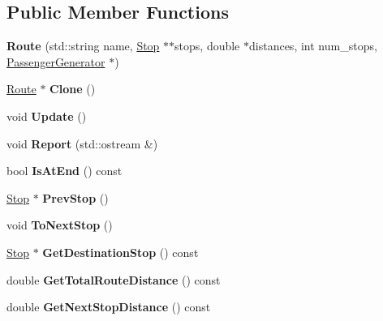 \subsection*{Public Member Functions}
\begin{DoxyCompactItemize}
\item 
\mbox{\label{classRoute_a623dad9165299b72eed1e188f7d3f382}} 
{\bfseries Route} (std\+::string name, \hyperlink{classStop}{Stop} $\ast$$\ast$stops, double $\ast$distances, int num\+\_\+stops, \hyperlink{classPassengerGenerator}{Passenger\+Generator} $\ast$)
\item 
\mbox{\label{classRoute_a4031b4a218b1530e28dcf5ee5c6fa8e7}} 
\hyperlink{classRoute}{Route} $\ast$ {\bfseries Clone} ()
\item 
\mbox{\label{classRoute_a7ecf1d4200f5fe110de4a1d9ea9408c3}} 
void {\bfseries Update} ()
\item 
\mbox{\label{classRoute_a6115a741ea15af716c1a624627ec954a}} 
void {\bfseries Report} (std\+::ostream \&)
\item 
\mbox{\label{classRoute_a529ab995aefd1001b250a6c1ccf77892}} 
bool {\bfseries Is\+At\+End} () const
\item 
\mbox{\label{classRoute_a1924b536cfdb17b5feea61e22fcb4a47}} 
\hyperlink{classStop}{Stop} $\ast$ {\bfseries Prev\+Stop} ()
\item 
\mbox{\label{classRoute_a0d2be355c05f40fda3f0b4e1811d2583}} 
void {\bfseries To\+Next\+Stop} ()
\item 
\mbox{\label{classRoute_a44af714485a55a8b6da374399e036cc1}} 
\hyperlink{classStop}{Stop} $\ast$ {\bfseries Get\+Destination\+Stop} () const
\item 
\mbox{\label{classRoute_af4e0add4a9f6b22963398b41313f9e69}} 
double {\bfseries Get\+Total\+Route\+Distance} () const
\item 
\mbox{\label{classRoute_af25192c44e2402660d54e7f32903ac25}} 
double {\bfseries Get\+Next\+Stop\+Distance} () const
\item 
$$
\end{DoxyCompactItemize}
